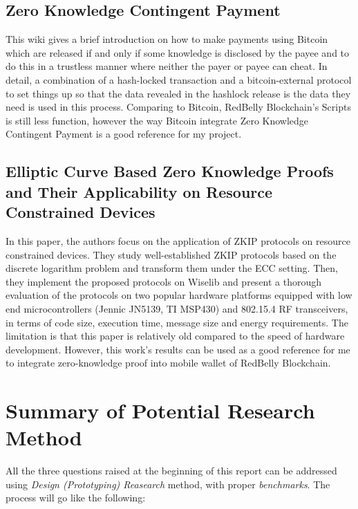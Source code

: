 \subsection{Zero Knowledge Contingent Payment\cite{wiki2011zero}}

This wiki gives a brief introduction on how to make payments using Bitcoin which are released 
if and only if some knowledge is disclosed by the payee and to do this in a trustless manner 
where neither the payer or payee can cheat. In detail, a combination of a hash-locked transaction 
and a bitcoin-external protocol to set things up so that the data revealed in the hashlock release
is the data they need is used in this process. Comparing to Bitcoin, RedBelly Blockchain's Scripts
is still less function, however the way Bitcoin integrate Zero Knowledge Contingent Payment is a
good reference for my project.

\subsection{Elliptic Curve Based Zero Knowledge Proofs and Their Applicability on Resource Constrained Devices\cite{ecc2011}}

In this paper, the authors focus on the application of ZKIP protocols on resource constrained 
devices. They study well-established ZKIP protocols based on the discrete logarithm problem and 
transform them under the ECC setting. Then, they implement the proposed protocols on Wiselib and 
present a thorough evaluation of the protocols on two popular hardware platforms equipped with 
low end microcontrollers (Jennic JN5139, TI MSP430) and 802.15.4 RF transceivers, 
in terms of code size, execution time, message size and energy requirements. The limitation is that
this paper is relatively old compared to the speed of hardware development. However, this work's 
results can be used as a good reference for me to integrate zero-knowledge proof into mobile wallet
of RedBelly Blockchain.

\section{Summary of Potential Research Method}

All the three questions raised at the beginning of this report can be addressed
using \textit{Design (Prototyping) Reasearch} method, with proper \textit{benchmarks}.
\newline
\newline
The process will go like the following:


